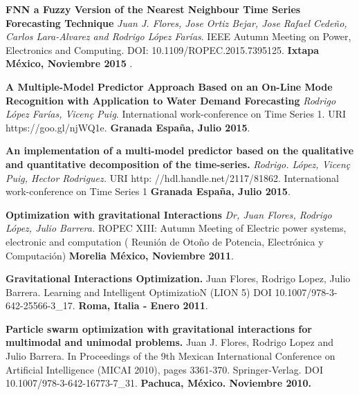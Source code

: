\documentclass[10pt]{article}
\newenvironment{innerlist}[1][\enskip\textbullet]%
        {\begin{compactitem}[#1]}{\end{compactitem}}
\begin{document}
\begin{innerlist}
\item \textbf{FNN a Fuzzy Version of the Nearest Neighbour Time Series Forecasting Technique } \textit{Juan J. Flores, Jose Ortiz Bejar, Jose Rafael Cedeño, Carlos Lara-Alvarez and Rodrigo López Farías}. {IEEE Autumn Meeting on Power, Electronics and Computing}. DOI: 10.1109/ROPEC.2015.7395125. \textbf{Ixtapa México, Noviembre 2015 }.

\item \textbf{A Multiple-Model Predictor Approach Based on an On-Line Mode Recognition with Application to Water Demand Forecasting} \textit{Rodrigo López Farías, Vicen\c{c} Puig}.  {International work-conference on Time Series 1. 
} URI https://goo.gl/njWQ1e. \textbf{Granada España, Julio 2015}.

\item \textbf{An implementation of a multi-model predictor based on the qualitative and quantitative decomposition of the time-series.} \textit{Rodrigo. López, Vicen\c{c} Puig, Hector Rodriguez.} URI http: //hdl.handle.net/2117/81862. {International work-conference on Time Series 1 
} \textbf{Granada España, Julio 2015}.

\item \textbf{Optimization with gravitational Interactions} \textit{Dr, Juan Flores, Rodrigo López, Julio Barrera.}   {ROPEC XIII: Autumn Meeting of Electric power systems, electronic and computation ( Reunión de Oto\~no de Potencia, Electrónica y Computación)} \textbf{ Morelia México, Noviembre 2011}.

\item \textbf{Gravitational Interactions Optimization.} Juan Flores, Rodrigo Lopez, Julio Barrera. {Learning and Intelligent OptimizatioN}  (LION 5) DOI 10.1007/978-3-642-25566-3\_17. \textbf{Roma, Italia - Enero 2011}. 

\item \textbf{Particle swarm optimization with gravitational interactions for multimodal and unimodal problems.} Juan J. Flores, Rodrigo Lopez and Julio Barrera.  In {Proceedings of the 9th Mexican International Conference on Artificial Intelligence (MICAI 2010)}, pages 3361-370. Springer-Verlag. DOI 10.1007/978-3-642-16773-7\_31. \textbf{Pachuca, México. Noviembre 2010.}

\end{innerlist}
\end{document}

